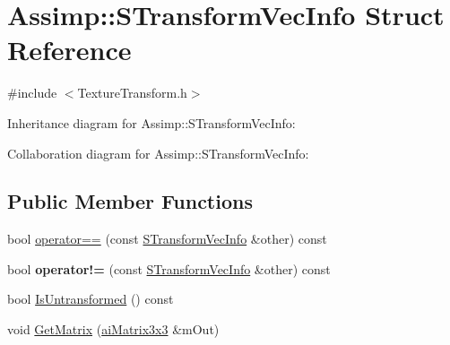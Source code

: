 \hypertarget{struct_assimp_1_1_s_transform_vec_info}{\section{Assimp\+:\+:S\+Transform\+Vec\+Info Struct Reference}
\label{struct_assimp_1_1_s_transform_vec_info}
}


{\ttfamily \#include $<$Texture\+Transform.\+h$>$}



Inheritance diagram for Assimp\+:\+:S\+Transform\+Vec\+Info\+:


Collaboration diagram for Assimp\+:\+:S\+Transform\+Vec\+Info\+:
\subsection*{Public Member Functions}
\begin{DoxyCompactItemize}
\item 
bool \hyperlink{struct_assimp_1_1_s_transform_vec_info_a194fd9e579a7d6ac53b884f892ec0c58}{operator==} (const \hyperlink{struct_assimp_1_1_s_transform_vec_info}{S\+Transform\+Vec\+Info} \&other) const 
\item 
\hypertarget{struct_assimp_1_1_s_transform_vec_info_aa4c264e77c5b1605aba11cd67c57b016}{bool {\bfseries operator!=} (const \hyperlink{struct_assimp_1_1_s_transform_vec_info}{S\+Transform\+Vec\+Info} \&other) const }\label{struct_assimp_1_1_s_transform_vec_info_aa4c264e77c5b1605aba11cd67c57b016}

\item 
bool \hyperlink{struct_assimp_1_1_s_transform_vec_info_a88c8aeb9bffcb253d3db96ffd7a6378d}{Is\+Untransformed} () const 
\item 
void \hyperlink{struct_assimp_1_1_s_transform_vec_info_acb6715cfdd163028fbb71468c2f27265}{Get\+Matrix} (\hyperlink{structai_matrix3x3}{ai\+Matrix3x3} \&m\+Out)
\end{DoxyCompactItemize}
